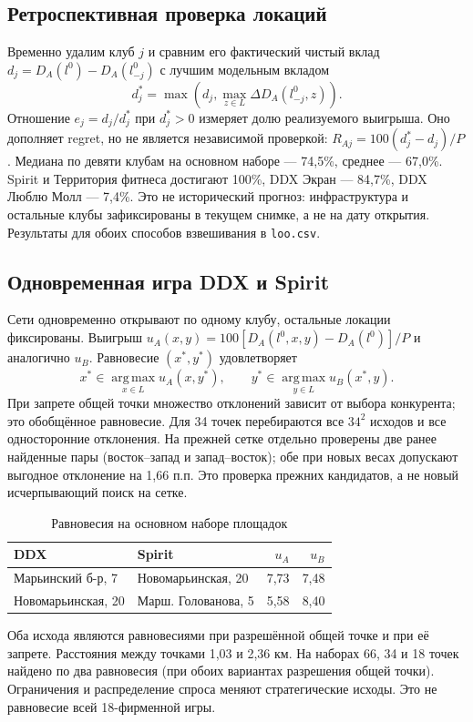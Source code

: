 \documentclass[12pt,a4paper]{article}
\newcommand{\argmax}{\operatorname*{arg\,max}}
\begin{document}
\subsection{Ретроспективная проверка локаций}
Временно удалим клуб $j$ и сравним его фактический чистый вклад $d_j=D_A(l^0)-D_A(l^0_{-j})$ с лучшим модельным вкладом
\[d_j^*=\max\left(d_j,\max_{z\in L}\Delta D_A(l^0_{-j},z)\right).\]
Отношение $e_j=d_j/d_j^*$ при $d_j^*>0$ измеряет долю реализуемого выигрыша. Оно дополняет regret, но не является независимой проверкой: $R_{Aj}=100(d_j^*-d_j)/P$. Медиана по девяти клубам на основном наборе --- 74,5\%, среднее --- 67,0\%. Spirit и Территория фитнеса достигают 100\%, DDX Экран --- 84,7\%, DDX Люблю Молл --- 7,4\%. Это не исторический прогноз: инфраструктура и остальные клубы зафиксированы в текущем снимке, а не на дату открытия. Результаты для обоих способов взвешивания в \texttt{loo.csv}.
\subsection{Одновременная игра DDX и Spirit}
Сети одновременно открывают по одному клубу, остальные локации фиксированы. Выигрыш $u_A(x,y)=100[D_A(l^0,x,y)-D_A(l^0)]/P$ и аналогично $u_B$. Равновесие $(x^*,y^*)$ удовлетворяет
\begin{equation}
 x^*\in\argmax_{x\in L}u_A(x,y^*),\qquad y^*\in\argmax_{y\in L}u_B(x^*,y).
\end{equation}
При запрете общей точки множество отклонений зависит от выбора конкурента; это обобщённое равновесие. Для 34 точек перебираются все $34^2$ исходов и все односторонние отклонения. На прежней сетке отдельно проверены две ранее найденные пары (восток--запад и запад--восток); обе при новых весах допускают выгодное отклонение на 1,66 п.п. Это проверка прежних кандидатов, а не новый исчерпывающий поиск на сетке.
\begin{table}[H]\centering\caption{Равновесия на основном наборе площадок}\small\begin{tabularx}{\linewidth}{YYrr}\toprule DDX & Spirit & $u_A$ & $u_B$\\\midrule Марьинский б-р, 7 & Новомарьинская, 20 & 7,73 & 7,48\\ Новомарьинская, 20 & Марш. Голованова, 5 & 5,58 & 8,40\\\bottomrule\end{tabularx}\end{table}
Оба исхода являются равновесиями при разрешённой общей точке и при её запрете. Расстояния между точками 1,03 и 2,36 км. На наборах 66, 34 и 18 точек найдено по два равновесия (при обоих вариантах разрешения общей точки). Ограничения и распределение спроса меняют стратегические исходы. Это не равновесие всей 18-фирменной игры.
\end{document}
